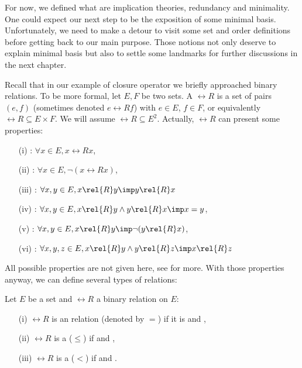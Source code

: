 \vspace{1.2em}

For now, we defined what are implication theories, redundancy and minimality. 
One could expect our next step to be the exposition of some minimal basis. 
Unfortunately, we need to make a detour to visit some set and order definitions
before getting back to our main purpose. Those notions not only deserve to
explain minimal basis but also to settle some landmarks for further discussions 
in the next chapter.

\vspace{1.2em}

Recall that in our example of closure operator we briefly approached binary 
relations. To be more formal, let $E, F$ be two sets. A  $\rel{R}$ is a set of pairs $(e, f)$ (sometimes denoted 
$e \rel{R} f$) with $e \in E$, $f \in F$, or equivalently $\rel{R} \subseteq E 
\times F$. We will assume $\rel{R} \subseteq E^2$. Actually, $\rel{R}$ can 
present some properties:
\begin{itemize}
	\item[(i)] : $\forall x \in E, x\rel{R}x$,
	\item[(ii)] : $\forall x \in E, \lnot(x\rel{R}x)$,
	\item[(iii)] : $\forall x, y \in E, x \rel{R} y \imp y 
	\rel{R} x$
	\item[(iv)] : $\forall x, y \in E, x \rel{R} y \land 
	y \rel{R} x \imp x = y$,
	\item[(v)] : $\forall x, y \in E, x \rel{R} y \imp
	\lnot(y\rel{R}x)$,
	\item[(vi)] : $\forall x, y, z \in E, x \rel{R} y 
	\land y \rel{R} z \imp x \rel{R} z$
\end{itemize}
All possible properties are not given here, see \cite{cori_mathematical_2000} 
for more. With those properties anyway, we can define several types of 
relations:

\begin{definition} Let $E$ be a set and $\rel{R}$ a binary relation on $E$:
\begin{itemize}
	\item[(i)] $\rel{R}$ is an  relation (denoted by $=$) 
	if it is  and ,
	
	\item[(ii)] $\rel{R}$ is a  ($\leq$) if 
	 and ,
	
	\item[(iii)] $\rel{R}$ is a  ($<$) if 
	 and .
\end{itemize}
	
\end{definition}

